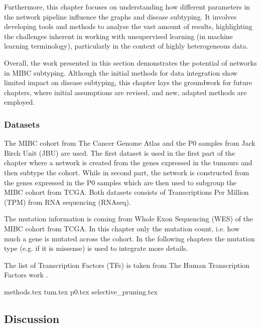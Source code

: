 Furthermore, this chapter focuses on understanding how different parameters in the network pipeline influence the graphs and disease subtyping. It involves developing tools and methods to analyse the vast amount of results, highlighting the challenges inherent in working with unsupervised learning (in machine learning terminology), particularly in the context of highly heterogeneous data.

Overall, the work presented in this section demonstrates the potential of networks in MIBC subtyping. Although the initial methods for data integration show limited impact on disease subtyping, this chapter lays the groundwork for future chapters, where initial assumptions are revised, and new, adapted methods are employed.

\subsubsection{Datasets}

The MIBC cohort from The Cancer Genome Atlas \cite{Robertson2017-mg} and the P0 samples from Jack Birch Unit (JBU) are used. The first dataset is used in the first part of the chapter where a network is created from the genes expressed in the tumours and then subtype the cohort. While in second part, the network is constructed from the genes expressed in the P0 samples which are then used to subgroup the MIBC cohort from TCGA. Both datasets consists of Transcriptions Per Million (TPM) from RNA sequencing (RNAseq). 

The mutation information is coming from Whole Exon Sequencing (WES) of the MIBC cohort from TCGA. In this chapter only the mutation count, i.e. how much a gene is mutated across the cohort. In the following chapters the mutation type (e.g. if it is missense) is used to integrate more details.

The list of Transcription Factors (TFs) is taken from The Human Transcription Factors work \citet{Lambert2018-el}.





{methods.tex}
\newpage
{tum.tex}
\newpage
{p0.tex}
\newpage
{selective_pruning.tex}
\newpage

\subsection{Discussion}

